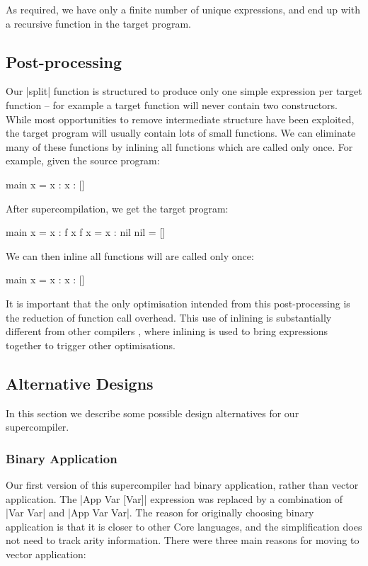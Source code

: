 \documentclass[draft]{sigplanconf}
\begin{document}
As required, we have only a finite number of unique expressions, and end up with a recursive function in the target program.

\subsection{Post-processing}
\label{sec:postprocess}

Our |split| function is structured to produce only one simple expression per target function -- for example a target function will never contain two constructors. While most opportunities to remove intermediate structure have been exploited, the target program will usually contain lots of small functions. We can eliminate many of these functions by inlining all functions which are called only once. For example, given the source program:

\begin{code}
main x = x : x : []
\end{code}

After supercompilation, we get the target program:

\begin{code}
main x = x : f x
f x = x : nil
nil = []
\end{code}

We can then inline all functions will are called only once:

\begin{code}
main x = x : x : []
\end{code}

It is important that the only optimisation intended from this post-processing is the reduction of function call overhead. This use of inlining is substantially different from other compilers \cite{spj:inlining}, where inlining is used to bring expressions together to trigger other optimisations.

\subsection{Alternative Designs}
\label{sec:extensions}

In this section we describe some possible design alternatives for our supercompiler.

\subsubsection{Binary Application}
\label{sec:binaryapp}

Our first version of this supercompiler had binary application, rather than vector application. The |App Var [Var]| expression was replaced by a combination of |Var Var| and |App Var Var|. The reason for originally choosing binary application is that it is closer to other Core languages, and the simplification does not need to track arity information. There were three main reasons for moving to vector application:
\end{document}
